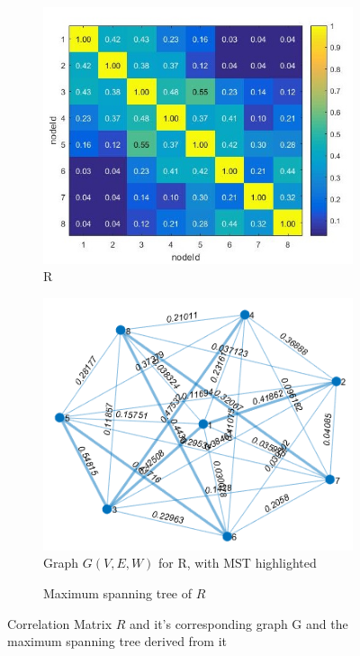 \begin{figure}[!ht]
\begin{subfigure}[b]{\textwidth}
\includegraphics[scale=0.75]{./pics/correlation.jpg}
\caption{R}
\centering
\label{fig:corrMatrix}
\end{subfigure}
\hfill
\begin{subfigure}[b]{0.5\textwidth}
\includegraphics[scale=0.5]{./pics/corrTree.jpg}
\centering
\caption {Graph $G(V,E,W)$ for R, with MST highlighted}
\label{fig:corrMatTree}
\end{subfigure}
\hfill
\begin{subfigure}[b]{0.3\textwidth}
\caption{Maximum spanning tree of $R$}
\label{fig:corrMST}
\end{subfigure}
\centering
\caption{Correlation Matrix $R$ and it's corresponding graph G and the maximum spanning tree derived from it}
\label{fig:materFig}
\end{figure}



